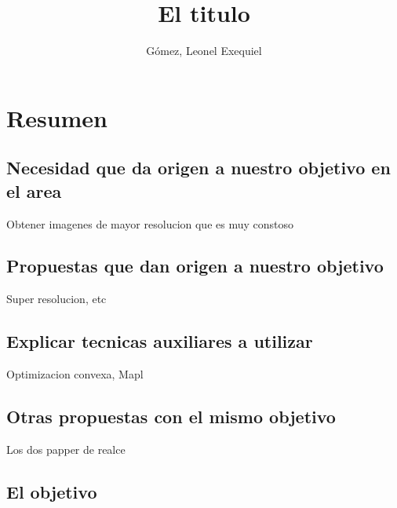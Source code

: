 \documentclass[a4paper,10pt]{article}
\title{El titulo}
\author{Gómez, Leonel Exequiel}
\begin{document}
\maketitle

\section{Resumen}

\subsection{Necesidad que da origen a nuestro objetivo en el area}
Obtener imagenes de mayor resolucion que es muy constoso

\subsection{Propuestas que dan origen a nuestro objetivo}
Super resolucion, etc


\subsection{Explicar tecnicas auxiliares a utilizar}
Optimizacion convexa, Mapl

\subsection{Otras propuestas con el mismo objetivo}
Los dos papper de realce

\subsection{El objetivo}


\clearpage


\end{document}
